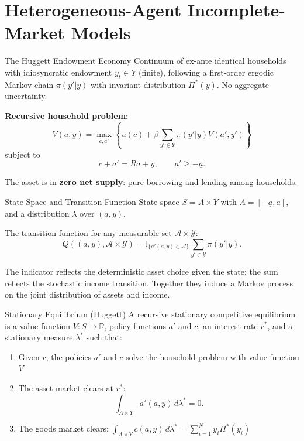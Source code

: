 \documentclass[blue]{beamer}
\begin{document}
	\section{Heterogeneous-Agent Incomplete-Market Models}
	
	\begin{frame}{The Huggett Endowment Economy}
		Continuum of ex-ante identical households with idiosyncratic endowment $y_t \in Y$ (finite), following a first-order ergodic Markov chain $\pi(y'|y)$ with invariant distribution $\Pi^*(y)$. No aggregate uncertainty.
		
		\bigskip
		\textbf{Recursive household problem}:
		\[
		V(a, y) = \max_{c, a'} \left\{u(c) + \beta \sum_{y' \in Y} \pi(y'|y) V(a', y')\right\}
		\]
		subject to
		\[
		c + a' = Ra + y, \qquad a' \geq -\underline{a}.
		\]
		
		The asset is in \textbf{zero net supply}: pure borrowing and lending among households.
	\end{frame}
	
	\begin{frame}{State Space and Transition Function}
		State space $S = A \times Y$ with $A = [-\underline{a}, \bar{a}]$, and a distribution $\lambda$ over $(a, y)$.
		
		\bigskip
		The transition function for any measurable set $\mathcal{A} \times \mathcal{Y}$:
		\[
		Q((a,y), \mathcal{A} \times \mathcal{Y}) = \mathbb{I}_{\{a'(a,y) \in \mathcal{A}\}} \sum_{y' \in \mathcal{Y}} \pi(y'|y).
		\]
		
		\bigskip
		The indicator reflects the deterministic asset choice given the state; the sum reflects the stochastic income transition. Together they induce a Markov process on the joint distribution of assets and income.
	\end{frame}
	
	\begin{frame}{Stationary Equilibrium (Huggett)}
		A recursive stationary competitive equilibrium is a value function $V: S \to \mathbb{R}$, policy functions $a'$ and $c$, an interest rate $r^*$, and a stationary measure $\lambda^*$ such that:
		
		\medskip
		\begin{enumerate}
			\item Given $r$, the policies $a'$ and $c$ solve the household problem with value function $V$
			\item The asset market clears at $r^*$:
			\[
			\int_{A \times Y} a'(a, y) \, d\lambda^* = 0.
			\]
			\item The goods market clears: $\int_{A \times Y} c(a,y) \, d\lambda^* = \sum_{i=1}^{N} y_i \Pi^*(y_i)$
		\end{enumerate}
	\end{frame}
	
\end{document}
